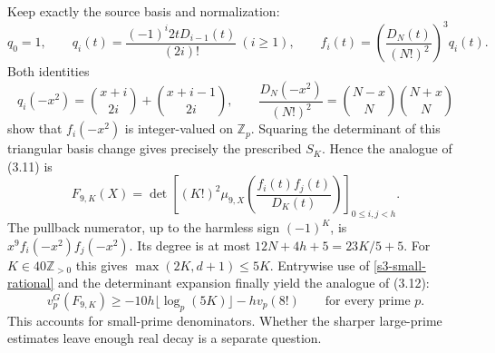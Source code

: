 Keep exactly the source basis and normalization:
\[
 q_0=1,\qquad q_i(t)=\frac{(-1)^i2tD_{i-1}(t)}{(2i)!}\ (i\geq1),
 \qquad f_i(t)=\left(\frac{D_N(t)}{(N!)^2}\right)^3q_i(t).
\]
Both identities
\[
 q_i(-x^2)=\binom{x+i}{2i}+\binom{x+i-1}{2i},\qquad
 \frac{D_N(-x^2)}{(N!)^2}=\binom{N-x}{N}\binom{N+x}{N}
\]
show that $f_i(-x^2)$ is integer-valued on $\mathbb Z_p$.
Squaring the determinant of this triangular basis change gives precisely
the prescribed $S_K$.  Hence the analogue of (3.11) is
\begin{equation}
 F_{9,K}(X)=\det\left[
 (K!)^2\mu_{9,X}\!\left(\frac{f_i(t)f_j(t)}{D_K(t)}\right)
 \right]_{0\leq i,j<h}.
 \label{s3-normalized-basis}
\end{equation}
The pullback numerator, up to the harmless sign $(-1)^K$, is
$x^9f_i(-x^2)f_j(-x^2)$.  Its degree is at most
$12N+4h+5=23K/5+5$.  For $K\in40\mathbb Z_{>0}$ this gives
$\max(2K,d+1)\leq5K$.  Entrywise use of
\eqref{s3-small-rational} and the determinant expansion finally yield
the analogue of (3.12):
\begin{equation}
 \boxed{\displaystyle
 v_p^G(F_{9,K})\geq
 -10h\lfloor\log_p(5K)\rfloor-hv_p(8!)
 \qquad\text{for every prime }p.}
 \label{s3-small-final}
\end{equation}
This accounts for small-prime denominators.  Whether the sharper
large-prime estimates leave enough real decay is a separate question.
